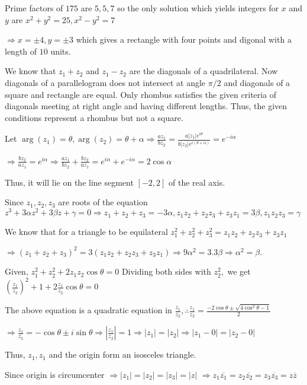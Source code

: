   Prime factors of $175$ are $5, 5, 7$ so the only solution which yields integers for $x$ and $y$ are $x^2 +
  y^2 = 25, x^2-y^2 = 7$

  $\Rightarrow x = \pm 4, y = \pm 3$ which gives a rectangle with four points and digonal with a length of
  $10$ units.
\item We know that $z_1 + z_2$ and $z_1 - z_2$ are the diagonals of a quadrilateral. Now diagonals of a
  parallelogram does not intersect at angle $\pi/2$ and diagonals of a square and rectangle are equal. Only
  rhombus satisfies the given criteria of diagonals meeting at right angle and having different lengths.
Thus, the given conditions represent a rhombus but not a square.
\item Let $\arg(z_1) = \theta, \arg(z_2) = \theta + \alpha \Rightarrow \frac{az_1}{bz_2} =
  \frac{a|z_1|e^{i\theta}}{b|z_2|e^{i(\theta + \alpha)}} = e^{-i\alpha}$

  $\Rightarrow \frac{bz_2}{az_1} = e^{i\alpha}\Rightarrow \frac{az_1}{bz_2} + \frac{bz_2}{az_1} =
  e^{i\alpha} + e^{-i\alpha} = 2\cos\alpha$

  Thus, it will lie on the line segment $[-2, 2]$ of the real axis.
\item Since $z_1, z_2, z_3$ are roots of the equation $z^3 + 3\alpha z^2 + 3\beta z + \gamma = 0\Rightarrow
  z_1 + z_2 + z_3 = -3\alpha, z_1z_2 + z_2z_3 + z_3z_1 = 3\beta, z_1z_2z_3 = \gamma$

  We know that for a triangle to be equilateral $z_1^2 + z_2^2 + z_3^2 = z_1z_2 + z_2z_3 + z_3z_1$

  $\Rightarrow (z_1 + z_2 + z_3)^2 = 3(z_1z_2 + z_2z_3 + z_3z_1)\Rightarrow 9\alpha^2 = 3.3\beta \Rightarrow
  \alpha^2 = \beta$.
\item Given, $z_1^2 + z_2^2 + 2z_1z_2\cos\theta = 0$ Dividing both sides with $z_2^2,$ we get
  $\left(\frac{z_1}{z_2}\right)^2 + 1 + 2\frac{z_1}{z_2}\cos\theta = 0$

  The above equation is a quadratic equation in $\frac{z_1}{z_2}, \therefore \frac{z_1}{z_2} =
  \frac{-2\cos\theta \pm\sqrt{4\cos^2\theta - 1}}{2}$

  $\Rightarrow \frac{z_1}{z_2} = -\cos\theta \pm i\sin\theta \Rightarrow \left|\frac{z_1}{z_2}\right| =
  1\Rightarrow |z_1| = |z_2| \Rightarrow |z_1 - 0| = |z_2 - 0|$

  Thus, $z_1, z_1$ and the origin form an isosceles triangle.
\item Since origin is circumcenter $\Rightarrow |z_1| = |z_2| = |z_3| = |z|$
  $\Rightarrow z_1\overline{z_1} = z_2\overline{z_2} = z_3\overline{z_3} = z\overline{z}$

